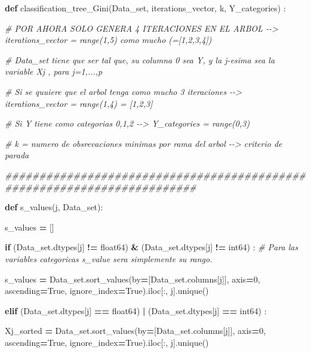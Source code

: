 \documentclass[
  11pt,
  a4paper,
]{article}
\newenvironment{Shaded}{\begin{snugshade}}{\end{snugshade}}
\newcommand{\CommentTok}[1]{\textcolor[rgb]{0.56,0.35,0.01}{\textit{#1}}}
\newcommand{\ControlFlowTok}[1]{\textcolor[rgb]{0.13,0.29,0.53}{\textbf{#1}}}
\newcommand{\DecValTok}[1]{\textcolor[rgb]{0.00,0.00,0.81}{#1}}
\newcommand{\KeywordTok}[1]{\textcolor[rgb]{0.13,0.29,0.53}{\textbf{#1}}}
\newcommand{\NormalTok}[1]{#1}
\newcommand{\OperatorTok}[1]{\textcolor[rgb]{0.81,0.36,0.00}{\textbf{#1}}}
\newcommand{\StringTok}[1]{\textcolor[rgb]{0.31,0.60,0.02}{#1}}
\newcommand{\VariableTok}[1]{\textcolor[rgb]{0.00,0.00,0.00}{#1}}
\begin{document}
\begin{Shaded}
\begin{Highlighting}[]
\KeywordTok{def}\NormalTok{ classification\_tree\_Gini(Data\_set, iterations\_vector, k, Y\_categories) :}

\CommentTok{\# POR AHORA SOLO GENERA 4 ITERACIONES EN EL ARBOL {-}{-}\textgreater{} iterations\_vector = range(1,5) como mucho (=[1,2,3,4])}

\CommentTok{\# Data\_set tiene que ser tal que, su columna 0 sea Y, y la j{-}esima sea la variable Xj , para j=1,...,p}

\CommentTok{\# Si se quuiere que el arbol tenga como mucho 3 iteraciones {-}{-}\textgreater{} iterations\_vector = range(1,4) = [1,2,3]}

\CommentTok{\# Si Y tiene como categorias 0,1,2 {-}{-}\textgreater{} Y\_categories = range(0,3)}

\CommentTok{\# k = numero de obsrevaciones minimas por rama del arbol {-}{-}\textgreater{} criterio de parada}

\CommentTok{\#\#\#\#\#\#\#\#\#\#\#\#\#\#\#\#\#\#\#\#\#\#\#\#\#\#\#\#\#\#\#\#\#\#\#\#\#\#\#\#\#\#\#\#\#\#\#\#\#\#\#\#\#\#\#\#\#\#\#\#\#\#\#\#\#\#\#\#\#\#\#\#}
    
    \KeywordTok{def}\NormalTok{ s\_values(j, Data\_set):}

\NormalTok{        s\_values }\OperatorTok{=}\NormalTok{ []}

        \ControlFlowTok{if}\NormalTok{  (Data\_set.dtypes[j] }\OperatorTok{!=} \StringTok{\textquotesingle{}float64\textquotesingle{}}\NormalTok{) }\OperatorTok{\&}\NormalTok{ (Data\_set.dtypes[j] }\OperatorTok{!=} \StringTok{\textquotesingle{}int64\textquotesingle{}}\NormalTok{) : }\CommentTok{\# Para las variables categoricas s\_value sera simplemente su rango.}

\NormalTok{            s\_values }\OperatorTok{=}\NormalTok{ Data\_set.sort\_values(by}\OperatorTok{=}\NormalTok{[Data\_set.columns[j]], axis}\OperatorTok{=}\DecValTok{0}\NormalTok{, ascending}\OperatorTok{=}\VariableTok{True}\NormalTok{, ignore\_index}\OperatorTok{=}\VariableTok{True}\NormalTok{).iloc[:, j].unique()}


        \ControlFlowTok{elif}\NormalTok{ (Data\_set.dtypes[j] }\OperatorTok{==} \StringTok{\textquotesingle{}float64\textquotesingle{}}\NormalTok{) }\OperatorTok{|}\NormalTok{ (Data\_set.dtypes[j] }\OperatorTok{==} \StringTok{\textquotesingle{}int64\textquotesingle{}}\NormalTok{) :}

\NormalTok{            Xj\_sorted }\OperatorTok{=}\NormalTok{ Data\_set.sort\_values(by}\OperatorTok{=}\NormalTok{[Data\_set.columns[j]], axis}\OperatorTok{=}\DecValTok{0}\NormalTok{, ascending}\OperatorTok{=}\VariableTok{True}\NormalTok{, ignore\_index}\OperatorTok{=}\VariableTok{True}\NormalTok{).iloc[:, j].unique()}


\end{Highlighting}
\end{Shaded}
\end{document}
